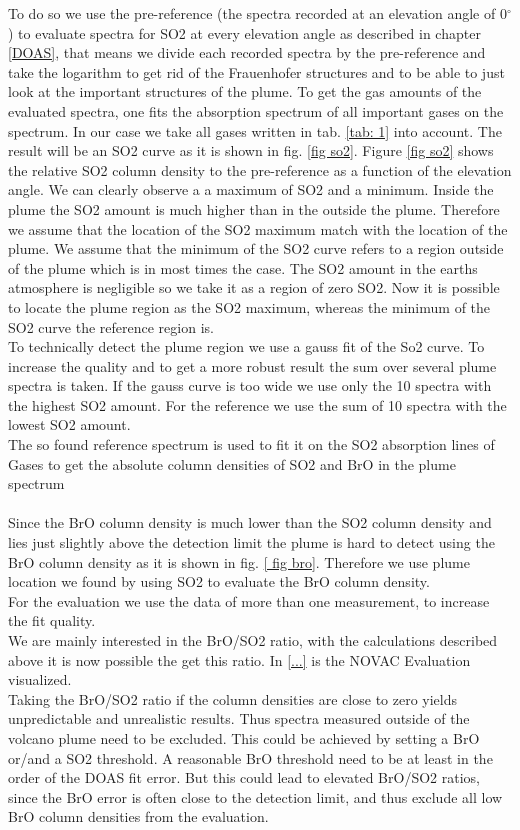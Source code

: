 \documentclass  [
  paper    = a4,
  BCOR     = 10mm,
  twoside,
  fontsize = 12pt,
  fleqn,
  toc      = bibnumbered,
  toc      = listofnumbered,
  numbers  = noendperiod,
  headings = normal,
  listof   = leveldown,
  version  = 3.03
]                                       {scrreprt}
\begin{document}
	To do so we use the pre-reference (the spectra recorded at an elevation angle of  0$^{\circ} $) to evaluate spectra for SO2 at every elevation angle as described in chapter \ref{DOAS}, that means we divide each recorded spectra by the pre-reference and take the logarithm  to get rid of the Frauenhofer structures and to be able to just look at the important structures of the plume. To get the gas amounts of the evaluated spectra, one fits the absorption spectrum of all important gases on the spectrum. In our case we take all gases written in tab. \ref{tab: 1} into account. The result will be an SO2 curve as it is shown in fig. \ref{fig so2}.
	Figure \ref{fig so2} shows the relative SO2 column density to the pre-reference as a function of the elevation angle. We can clearly observe a a maximum of SO2 and a minimum. Inside the plume the SO2 amount is much higher than in the outside the plume. Therefore we assume that the location of the SO2 maximum match with the location of the plume. We assume that the minimum of the SO2 curve refers to a region outside of the plume which is in most times the case. The SO2 amount in the earths atmosphere is negligible so we take it as a region of zero SO2. Now it is possible to locate the plume region as the SO2 maximum, whereas the minimum of the SO2 curve the reference region is. \\
	To technically detect the plume region we use a gauss fit of the So2 curve.
	To increase the quality and to get a more robust result the sum over several plume spectra is taken. If the gauss curve is too wide we use only the 10 spectra with the highest SO2 amount. For the reference we use the sum of 10 spectra with the lowest SO2 amount.\\
	The so found reference spectrum is used to fit it on the SO2 absorption lines of Gases to get the absolute column densities of SO2 and BrO in the plume spectrum\\
	\\
	Since the BrO column density is much lower than the SO2 column density and lies just slightly above the detection limit the plume is hard to detect using the BrO column density as it is shown in fig. \ref{ fig bro}. 
	Therefore we use plume location we found by using SO2 to evaluate the BrO column density.\\
	For the evaluation we use the data of more than one measurement, to increase the fit quality.\\
	We are mainly interested in the BrO/SO2 ratio, with the calculations described above it is now possible the get this ratio.
	In \cref{...} is the NOVAC Evaluation visualized.\\
	Taking the BrO/SO2 ratio if the column densities are close to zero yields unpredictable and unrealistic results. Thus spectra measured outside of the volcano plume need to be excluded.
	This could be achieved by setting a BrO or/and a SO2 threshold. A reasonable BrO threshold need to be at least in the order of the DOAS fit error. But this could lead to elevated BrO/SO2 ratios, since the BrO error is often close to the detection limit, and thus exclude all low BrO column densities from the evaluation.
	
\end{document}
